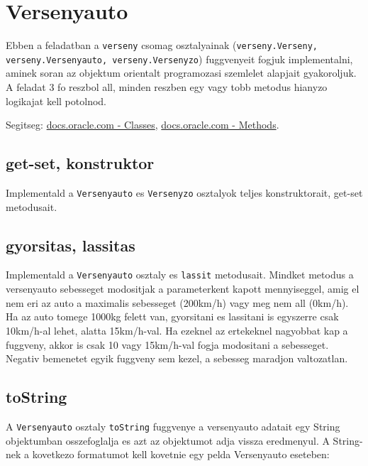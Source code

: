 \documentclass{article}
\begin{document}
\newpage

\section{Versenyauto}

Ebben a feladatban a \lstinline{verseny} csomag osztalyainak (\lstinline|verseny.Verseny,|\\\lstinline|verseny.Versenyauto, verseny.Versenyzo|) fuggvenyeit fogjuk implementalni, aminek soran az objektum orientalt programozasi szemlelet alapjait gyakoroljuk. A feladat 3 fo reszbol all, minden reszben egy vagy tobb metodus hianyzo logikajat kell potolnod.


Segitseg: \href{https://docs.oracle.com/javase/tutorial/java/javaOO/classes.html}{docs.oracle.com - Classes}, \href{https://docs.oracle.com/javase/tutorial/java/javaOO/methods.html}{docs.oracle.com - Methods}.

\subsection{get-set, konstruktor}
Implementald a \lstinline{Versenyauto} es \lstinline{Versenyzo} osztalyok teljes konstruktorait, get-set metodusait.

\subsection{gyorsitas, lassitas}
Implementald a \lstinline{Versenyauto} osztaly  es \lstinline{lassit} metodusait. Mindket metodus a versenyauto sebesseget modositjak a parameterkent kapott mennyiseggel, amig el nem eri az auto a maximalis sebesseget (200km/h) vagy meg nem all (0km/h). Ha az auto tomege 1000kg felett van, gyorsitani es lassitani is egyszerre csak 10km/h-al lehet, alatta 15km/h-val. Ha ezeknel az ertekeknel nagyobbat kap a fuggveny, akkor is csak 10 vagy 15km/h-val fogja modositani a sebesseget. Negativ bemenetet egyik fuggveny sem kezel, a sebesseg maradjon valtozatlan.

\subsection{toString}
A \lstinline{Versenyauto} osztaly \lstinline{toString} fuggvenye a versenyauto adatait egy String objektumban osszefoglalja es azt az objektumot adja vissza eredmenyul. A String-nek a kovetkezo formatumot kell kovetnie egy pelda Versenyauto eseteben:
\end{document}

